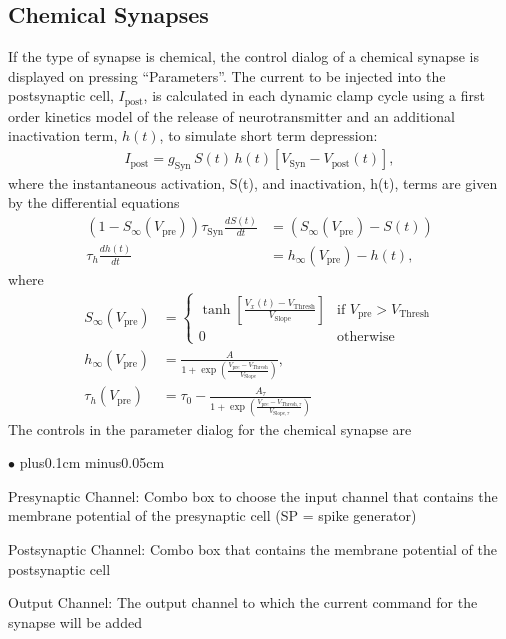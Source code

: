 \documentclass{article}
\newenvironment{myitem}{\begin{list}{$\bullet$}{\setlength{\leftmargin}{1.1em}
\itemsep0.1cm plus0.1cm minus0.05cm
\listparindent0cm
\addtolength{\labelsep}{0.5\labelsep}
\setlength{\labelwidth}{0.8em}
\setlength{\leftmargin}{\labelwidth}
\addtolength{\leftmargin}{\labelsep}
}}{\end{list}}
\begin{document}
\subsection{Chemical Synapses}
If the type of synapse is chemical, the control dialog of a chemical
synapse is displayed on pressing ``Parameters''. The current to be
injected into the postsynaptic cell, $I_{\text{post}}$, is calculated
in each dynamic clamp cycle using a first order kinetics model of the
release of neurotransmitter and an additional
inactivation term, $h(t)$, to simulate short term depression:
\begin{align}
  I_{\text{post}} = g_{\text{Syn}} \, S(t) \, h(t) [V_{\text{Syn}} -
    V_{\text{post}}(t)],
\end{align}
where the instantaneous activation, S(t), and inactivation, h(t), terms are
given by the differential equations
\begin{align}
(1-S_\infty(V_{\text{pre}})) \tau_{\text{Syn}} \frac{dS(t)}{dt} &=
(S_\infty(V_{\text{pre}}) - S(t)) \\ \tau_h \frac{dh(t)}{dt} &=
h_\infty(V_{\text{pre}}) - h(t),
\end{align}
where
\begin{align}
S_\infty(V_{\text{pre}}) &= \left\{
\begin{array}{ll}
  \tanh\left[\frac{V_x(t) - V_{\text{Thresh}}}{V_{\text{Slope}}}
    \right] & \text{if } V_{\text{pre}} > V_{\text{Thresh}} \\ 0 &
  \text{otherwise}
  \end{array}
\right. \\ 
%
h_\infty(V_{\text{pre}})&=
\frac{A}{1+\exp\left(\frac{V_{\text{pre}} -
    V_{\text{Thresh}}}{V_{\text{Slope}}}\right)}, \\  
\tau_h(V_{\text{pre}})&= \tau_{0} -
\frac{A_\tau}{1+\exp\left(\frac{V_{\text{pre}} -
    V_{\text{Thresh},\tau}}{V_{\text{Slope},\tau}} \right)}
\end{align}                                              
  The controls in the parameter dialog for the chemical synapse are
  \begin{myitem}
  \item Presynaptic Channel: Combo box to choose the input channel
    that contains the membrane potential of the presynaptic cell (SP = spike
    generator) 
  \item Postsynaptic Channel: Combo box that contains the membrane
    potential of the postsynaptic cell
\item Output Channel: The output channel to which the current command
  for the synapse will be added
\end{myitem}
\end{document}
